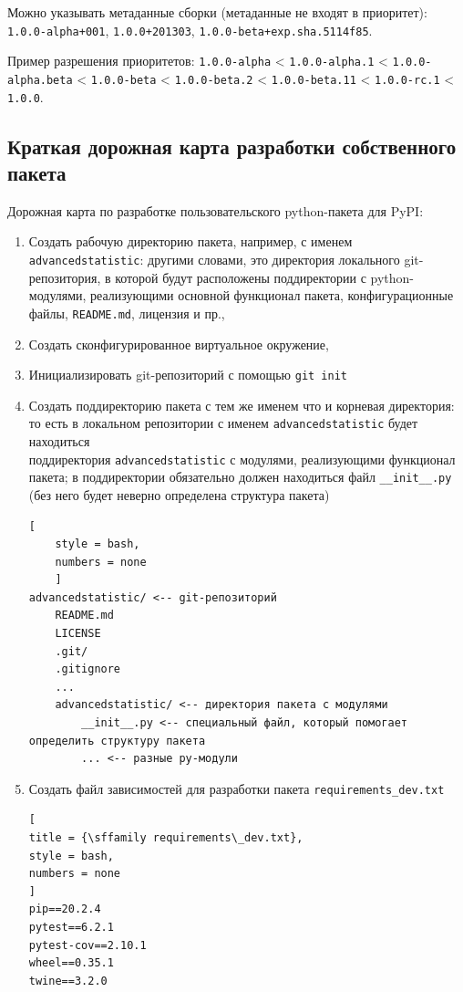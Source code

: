 \documentclass[%
	11pt,
	a4paper,
	utf8,
		]{article}
\begin{document}
Можно указывать метаданные сборки (метаданные не входят в приоритет): \texttt{1.0.0-alpha+001}, \texttt{1.0.0+201303}, \texttt{1.0.0-beta+exp.sha.5114f85}.

Пример разрешения приоритетов: \texttt{1.0.0-alpha} < \texttt{1.0.0-alpha.1} < \texttt{1.0.0-alpha.beta} < \texttt{1.0.0-beta} < \texttt{1.0.0-beta.2} < \texttt{1.0.0-beta.11} < \texttt{1.0.0-rc.1} < \texttt{1.0.0}.

\subsection{Краткая дорожная карта разработки собственного пакета}

Дорожная карта по разработке пользовательского python-пакета для PyPI:

\begin{enumerate}
	\item Создать рабочую директорию пакета, например, с именем \texttt{advancedstatistic}: другими словами, это директория локального git-репозитория, в которой будут расположены поддиректории с python-модулями, реализующими основной функционал пакета, конфигурационные файлы, \texttt{README.md}, лицензия и пр.,
	
	\item Создать сконфигурированное виртуальное окружение,
	
	\item Инициализировать git-репозиторий с помощью \texttt{git init}
	
	\item Создать поддиректорию пакета с тем же именем что и корневая директория: то есть в локальном репозитории с именем \texttt{advancedstatistic} будет находиться\\ поддиректория \texttt{advancedstatistic} с модулями, реализующими функционал пакета; в поддиректории обязательно должен находиться файл \texttt{\_\_init\_\_.py} (без него будет неверно определена структура пакета)
	\begin{lstlisting}[
	style = bash,
	numbers = none
	]
advancedstatistic/ <-- git-репозиторий
    README.md
    LICENSE
    .git/
    .gitignore
    ...
    advancedstatistic/ <-- директория пакета с модулями
        __init__.py <-- специальный файл, который помогает определить структуру пакета
        ... <-- разные py-модули
	\end{lstlisting}
	
	\item Создать файл зависимостей для разработки пакета \texttt{requirements\_dev.txt}
\begin{lstlisting}[
title = {\sffamily requirements\_dev.txt},
style = bash,
numbers = none	
]
pip==20.2.4
pytest==6.2.1
pytest-cov==2.10.1
wheel==0.35.1
twine==3.2.0
\end{lstlisting}


\end{enumerate}
\end{document}
